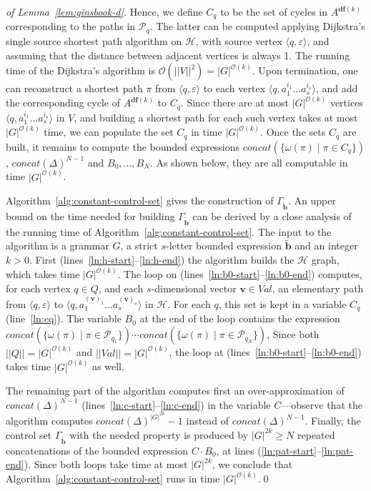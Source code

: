 \documentclass[final]{llncs}
\def\tuple#1{{\langle #1 \rangle}}
\def\card#1{{|\!|{#1}|\!|}}
\def\len#1{{\vert{#1}\vert}}
\def\prod{\Delta}
\def\patt{{\widetilde{\mathbf{b}}}}
\def\pattg{{\Gamma_\patt}}
\def\df#1{\scriptscriptstyle\mathbf{df}(#1)}
\begin{document}
\begin{proof}[of Lemma~\ref{lem:ginsbook-d}]
Hence, we define $C_q$ to be the set of cycles in $A^{\df{k}}$ corresponding to the paths in
$\mathcal{P}_q$.  The latter can be computed applying Dijkstra's single source
shortest path algorithm on $\mathcal{H}$, with source vertex
$\tuple{q, \varepsilon}$, and assuming that the distance between adjacent
vertices is always 1. The running time of the Dijkstra's algorithm is
$\mathcal{O}(\card{V}^2) = \len{G}^{\mathcal{O}(k)}$. Upon
termination, one can reconstruct a shortest path $\pi$ from
$\tuple{q, \varepsilon}$ to each vertex $\tuple{q, a_1^{i_1}\ldots a_s^{i_s}}$, and add the
corresponding cycle of $A^{\df{k}}$ to $C_q$. Since there are at most
$\len{G}^{\mathcal{O}(k)}$ vertices $\tuple{q, a_1^{i_1}\ldots a_s^{i_s}}$ in $V$, and
building a shortest path for each such vertex takes at most
$\len{G}^{\mathcal{O}(k)}$ time, we can populate the set $C_q$ in time
$\len{G}^{\mathcal{O}(k)}$. Once the sets $C_q$ are built, it remains
to compute the bounded expressions $\mathit{concat}(\{ \omega(\pi) \mid \pi \in C_{q}\})$,
$\mathit{concat}(\Delta)^{N-1}$ and $B_0, \ldots, B_N$.  As shown
below, they are all computable in time $\len{G}^{\mathcal{O}(k)}$.

Algorithm~\ref{alg:constant-control-set} gives the construction
of \(\pattg\). An upper bound on the time needed for
building \(\pattg\) can be derived by a close analysis of the running
time of Algorithm~\ref{alg:constant-control-set}. The input to the
algorithm is a grammar $G$, a strict $s$-letter bounded expression
$\patt$ and an integer $k > 0$. First
(lines~\ref{ln:h-start}--\ref{ln:h-end}) the algorithm builds the
$\mathcal{H}$ graph, which takes time $\len{G}^{\mathcal{O}(k)}$. The
loop on (lines~\ref{ln:b0-start}--\ref{ln:b0-end}) computes, for each
vertex $q \in Q$, and each \(s\)-dimensional vector
$\boldsymbol{v} \in \mathit{Val}$, an elementary path from
$\tuple{q,\varepsilon}$ to $\tuple{q,a_1^{(\boldsymbol{v})_1}\ldots a_s^{(\boldsymbol{v})_s}}$ in
$\mathcal{H}$.  For each $q$, this set is kept in a variable
$C_q$ (line~\ref{ln:cq}). The variable $B_0$ at the end of
the loop contains the expression
$\mathit{concat}(\{ \omega(\pi) \mid \pi \in \mathcal{P}_{q_1}\}) \cdots \mathit{concat}(\{ \omega(\pi) \mid \pi \in \mathcal{P}_{q_N}\})$,
Since both $\card{Q} = \len{G}^{\mathcal{O}(k)}$
and $\card{\mathit{Val}} = \len{G}^{\mathcal{O}(k)}$, the loop at
(lines~\ref{ln:b0-start}--\ref{ln:b0-end}) takes time
$\len{G}^{\mathcal{O}(k)}$ as well.

The remaining part of the algorithm computes first an
over-approximation of $\mathit{concat}(\prod)^{N-1}$
(lines~\ref{ln:c-start}--\ref{ln:c-end}) in the variable $C$---observe
that the algorithm computes $\mathit{concat}(\prod)^{\len{G}^{2k}}-1$
instead of $\mathit{concat}(\prod)^{N-1}$. Finally, the control set
$\pattg$ with the needed property is produced by
$\len{G}^{2k} \geq N$ repeated concatenations of the bounded
expression $C \cdot B_0$, at lines
(\ref{ln:pat-start}--\ref{ln:pat-end}). Since both loops take time at
most $\len{G}^{2k}$, we conclude that Algorithm~\ref{alg:constant-control-set} 
runs in time $\len{G}^{\mathcal{O}(k)}$.\qed
\end{proof}
\end{document}
